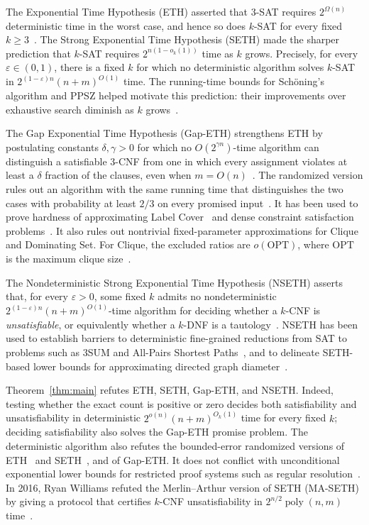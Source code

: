 \documentclass[11pt,reqno]{amsart}
\numberwithin{equation}{section}
\theoremstyle{definition}\newtheorem{definition}[theorem]{Definition}
\theoremstyle{remark}\newtheorem{remark}[theorem]{Remark}
\newcommand{\poly}{\operatorname{poly}}
\renewcommand{\ge}{\geqslant}
\begin{document}
The Exponential Time Hypothesis (ETH) asserted that $3$-SAT requires
$2^{\Omega(n)}$ deterministic time in the worst case, and hence so does
$k$-SAT for every fixed $k\ge3$~\cite[Theorem~1]{IP01}.
The Strong Exponential Time Hypothesis (SETH) made the sharper
prediction that $k$-SAT requires $2^{n(1-o_k(1))}$ time as $k$ grows.
Precisely, for every $\varepsilon\in(0,1)$, there is a fixed $k$ for
which no deterministic algorithm solves $k$-SAT in
$2^{(1-\varepsilon)n}(n+m)^{O(1)}$ time.
The running-time bounds for Sch\"oning's algorithm and PPSZ helped
motivate this prediction: their improvements over exhaustive search
diminish as $k$ grows~\cite[Open Problems, item~2]{IP01}.

The Gap Exponential Time Hypothesis (Gap-ETH) strengthens ETH by
postulating constants $\delta,\gamma>0$ for which no $O(2^{\gamma n})$-time
algorithm can distinguish a satisfiable $3$-CNF from one in which
every assignment violates at least a $\delta$ fraction of the clauses,
even when $m=O(n)$~\cite{Din16,MR17}. The randomized version rules
out an algorithm with the same running time that distinguishes the
two cases with probability at least $2/3$ on every promised
input~\cite[Conjecture~2.5]{CCK20}.
It has been used to prove hardness of approximating Label
Cover~\cite{Din16} and dense constraint satisfaction
problems~\cite{MR17}. It also rules out nontrivial fixed-parameter
approximations for Clique and Dominating Set. For Clique, the excluded
ratios are $o(\mathrm{OPT})$, where $\mathrm{OPT}$ is the maximum
clique size~\cite[Corollaries~5.3 and~5.6]{CCK20}.

The Nondeterministic Strong Exponential Time Hypothesis (NSETH)
asserts that, for every $\varepsilon>0$, some fixed $k$ admits no
nondeterministic $2^{(1-\varepsilon)n}(n+m)^{O(1)}$-time algorithm
for deciding whether a $k$-CNF is \emph{unsatisfiable}, or equivalently
whether a $k$-DNF is a tautology~\cite{CGIMPS16}.
NSETH has been used to establish barriers to deterministic fine-grained
reductions from SAT to problems such as 3SUM and All-Pairs Shortest
Paths~\cite{CGIMPS16}, and to delineate SETH-based lower bounds for
approximating directed graph diameter~\cite{Li21}.

Theorem~\ref{thm:main} refutes ETH, SETH, Gap-ETH, and NSETH.
Indeed, testing whether the exact count is positive or zero decides
both satisfiability and unsatisfiability in deterministic
$2^{o(n)}(n+m)^{O_k(1)}$ time for every fixed $k$; deciding
satisfiability also solves the Gap-ETH promise problem.
The deterministic algorithm also refutes the bounded-error randomized
versions of ETH~\cite[Section~1]{DHMTW} and SETH~\cite[Definition~2.1]{CDL16}, and of Gap-ETH.
It does not conflict with unconditional exponential lower bounds for
restricted proof systems such as regular resolution~\cite{BeckImp13}.
In 2016, Ryan Williams refuted the Merlin--Arthur version of SETH
(MA-SETH) by giving a protocol that certifies $k$-CNF unsatisfiability
in $2^{n/2}\poly(n,m)$ time~\cite[Theorem~3.3]{Wil16}.
\end{document}
